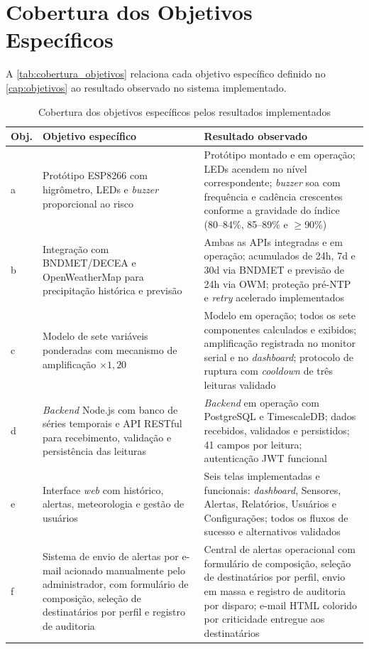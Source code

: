 \section{Cobertura dos Objetivos Específicos}
\label{sec:cobertura}

A \autoref{tab:cobertura_objetivos} relaciona cada objetivo específico
definido no \autoref{cap:objetivos} ao resultado observado no sistema
implementado.

\begin{table}[htb]
\centering
\caption{Cobertura dos objetivos específicos pelos resultados implementados}
\label{tab:cobertura_objetivos}
\begin{tabular}{p{}p{}p{}}
\hline
\textbf{Obj.} & \textbf{Objetivo específico} & \textbf{Resultado observado} \\
\hline
a & Protótipo ESP8266 com higrômetro, LEDs e \textit{buzzer} proporcional
ao risco &
Protótipo montado e em operação; LEDs acendem no nível correspondente;
\textit{buzzer} soa com frequência e cadência crescentes conforme a
gravidade do índice (80--84\%, 85--89\% e $\geq$90\%) \\
\hline
b & Integração com BNDMET/DECEA e OpenWeatherMap para precipitação
histórica e previsão &
Ambas as APIs integradas e em operação; acumulados de 24h, 7d e 30d via
BNDMET e previsão de 24h via OWM; proteção pré-NTP e \textit{retry}
acelerado implementados \\
\hline
c & Modelo de sete variáveis ponderadas com mecanismo de amplificação
$\times 1{,}20$ &
Modelo em operação; todos os sete componentes calculados e exibidos;
amplificação registrada no monitor serial e no \textit{dashboard};
protocolo de ruptura com \textit{cooldown} de três leituras validado \\
\hline
d & \textit{Backend} Node.js com banco de séries temporais e API
RESTful para recebimento, validação e persistência das leituras &
\textit{Backend} em operação com PostgreSQL e TimescaleDB; dados
recebidos, validados e persistidos; 41 campos por leitura;
autenticação JWT funcional \\
\hline
e & Interface \textit{web} com histórico, alertas, meteorologia e
gestão de usuários &
Seis telas implementadas e funcionais: \textit{dashboard}, Sensores,
Alertas, Relatórios, Usuários e Configurações; todos os fluxos de
sucesso e alternativos validados \\
\hline
f & Sistema de envio de alertas por e-mail acionado manualmente pelo
administrador, com formulário de composição, seleção de destinatários
por perfil e registro de auditoria &
Central de alertas operacional com formulário de composição, seleção
de destinatários por perfil, envio em massa e registro de auditoria
por disparo; e-mail HTML colorido por criticidade entregue aos
destinatários \\
\hline
\end{tabular}
\end{table}

